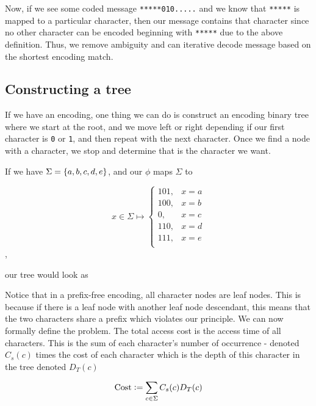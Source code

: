 Now, if we see some coded message \texttt{*****010.....} and we know that \texttt{*****} is mapped to a particular character, then our message contains that character since no other character can be encoded beginning with \texttt{*****} due to the above definition. Thus, we remove ambiguity and can iterative decode message based on the shortest encoding match. 

\subsection{Constructing a tree}

If we have an encoding, one thing we can do is construct an encoding binary tree where we start at the root, and we move left or right depending if our first character is \texttt{0} or \texttt{1}, and then repeat with the next character. 
Once we find a node with a character, we stop and determine that is the character we want. 

\begin{example}
If we have $\Sigma=\cbr{a,b,c,d,e}$, and our $\phi$ maps $\Sigma$ to

\[
    x \in \Sigma \mapsto \begin{cases}
        101, & x=a \\
        100, & x=b \\
        0, & x=c \\
        110, & x=d \\
        111, & x=e \\
    \end{cases}
\],

our tree would look as

\begin{center}
\end{center}

\end{example}

Notice that in a prefix-free encoding, all character nodes are leaf nodes. 
This is because if there is a leaf node with another leaf node descendant, this means that the two characters share a prefix which violates our principle. 
We can now formally define the problem. The total access cost is the access time of all characters. This is the sum of each character's number of occurrence - denoted $C_s(c)$ times the cost of each character which is the depth of this character in the tree denoted $D_T(c)$

\[
    \mathrm{Cost} := \sum_{c \in \Sigma} C_s(c) D_T(c)  
\]

